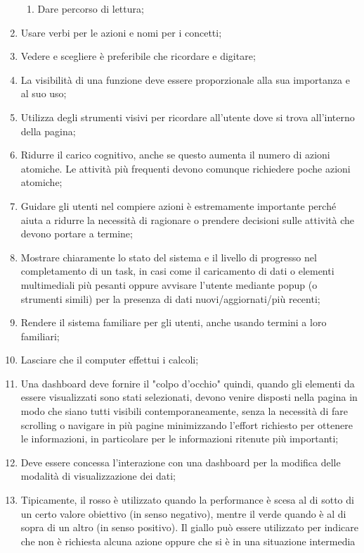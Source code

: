 \begin{enumerate}
\begin{enumerate}
        \item Dare percorso di lettura;
    \end{enumerate}
    \item Usare verbi per le azioni e nomi per i concetti;
    \item Vedere e scegliere è preferibile che ricordare e digitare;
    \item La visibilità di una funzione deve essere proporzionale alla sua importanza e al suo uso;
    \item Utilizza degli strumenti visivi per ricordare all'utente dove si trova all'interno della pagina;
    \item Ridurre il carico cognitivo, anche se questo aumenta il numero di azioni atomiche. Le attività più frequenti devono comunque richiedere poche azioni atomiche;
    \item Guidare gli utenti nel compiere azioni è estremamente importante perché aiuta a ridurre la necessità di ragionare o prendere decisioni sulle attività che devono portare a termine;
    \item Mostrare chiaramente lo stato del sistema e il livello di progresso nel completamento di un task, in casi come il caricamento di dati o elementi multimediali più pesanti oppure avvisare l'utente mediante popup (o strumenti simili) per la presenza di dati nuovi/aggiornati/più recenti;
    \item Rendere il sistema familiare per gli utenti, anche usando termini a loro familiari;
    \item Lasciare che il computer effettui i calcoli;
    \item Una dashboard deve fornire il "colpo d'occhio" quindi, quando gli elementi da essere visualizzati sono stati selezionati, devono venire disposti nella pagina in modo che siano tutti visibili contemporaneamente, senza la necessità di fare scrolling o navigare in più pagine minimizzando l'effort richiesto per ottenere le informazioni, in particolare per le informazioni ritenute più importanti;
    \item Deve essere concessa l'interazione con una dashboard per la modifica delle modalità di visualizzazione dei dati;
    \item Tipicamente, il rosso è utilizzato quando la performance è scesa al di sotto di un certo valore obiettivo (in senso negativo), mentre il verde quando è al di sopra di un altro (in senso positivo). Il giallo può essere utilizzato per indicare che non è richiesta alcuna azione oppure che si è in una situazione intermedia

\end{enumerate}
